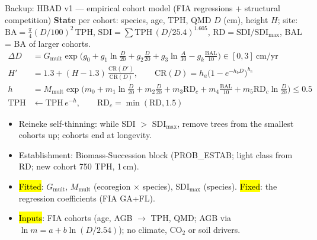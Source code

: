\begin{frame}{Backup: HBAD v1 — empirical cohort model (FIA regressions + structural competition)}
\footnotesize
\textbf{State} per cohort: species, age, TPH, QMD $D$ (cm), height $H$; site: $\text{BA}=\tfrac{\pi}{4}(D/100)^2\,\text{TPH}$, $\text{SDI}=\sum\text{TPH}\,(D/25.4)^{1.605}$, $\text{RD}=\text{SDI}/\text{SDI}_{\max}$, BAL = BA of larger cohorts.
\begin{align*}
\Delta D &= G_{\text{mult}}\exp\!\bigl(g_0+g_1\ln\tfrac D{20}+g_2\tfrac D{20}+g_3\ln\tfrac{A}{30}-g_k\tfrac{\text{BAL}}{10}\bigr)\in[0,3]\ \text{cm/yr}\\
H' &= 1.3+(H-1.3)\,\frac{\text{CR}(D')}{\text{CR}(D)},\qquad \text{CR}(D)=h_a\bigl(1-e^{-h_bD}\bigr)^{h_c}\\
h &= M_{\text{mult}}\exp\!\bigl(m_0+m_1\ln\tfrac D{20}+m_2\tfrac D{20}+m_3\text{RD}_c+m_4\tfrac{\text{BAL}}{10}+m_5\text{RD}_c\ln\tfrac D{20}\bigr)\le0.5\\
\text{TPH} &\leftarrow \text{TPH}\,e^{-h},\qquad \text{RD}_c=\min(\text{RD},1.5)
\end{align*}
\vspace{-4pt}
\begin{itemize}\setlength\itemsep{1pt}
\item Reineke self-thinning: while SDI $>$ SDI$_{\max}$, remove trees from the smallest cohorts up; cohorts end at longevity.
\item Establishment: Biomass-Succession block (PROB\_ESTAB; light class from RD; new cohort 750 TPH, 1\,cm).
\item \hl{Fitted}: $G_{\text{mult}}$, $M_{\text{mult}}$ (ecoregion $\times$ species), SDI$_{\max}$ (species). \hl{Fixed}: the regression coefficients (FIA GA+FL).
\item \hl{Inputs}: FIA cohorts (age, AGB $\rightarrow$ TPH, QMD; AGB via $\ln m = a+b\ln(D/2.54)$); no climate, CO$_2$ or soil drivers.
\end{itemize}
\end{frame}




